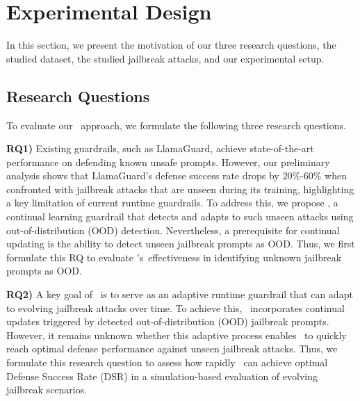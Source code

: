 \section{Experimental Design}
\label{sec:exp_design}
In this section, we present the motivation of our three research questions, the studied dataset, the studied jailbreak attacks, and our experimental setup.

\subsection{Research Questions}
To evaluate our \ourapp~approach, we formulate the following three research questions.

{\bf RQ1)} {\bf \rqone}
Existing guardrails, such as LlamaGuard, achieve state-of-the-art performance on defending known unsafe prompts. However, our preliminary analysis shows that LlamaGuard’s defense success rate drops by 20\%-60\% when confronted with jailbreak attacks that are unseen during its training, highlighting a key limitation of current runtime guardrails. To address this, we propose \ourapp, a continual learning guardrail that detects and adapts to such unseen attacks using out-of-distribution (OOD) detection. Nevertheless, a prerequisite for continual updating is the ability to detect unseen jailbreak prompts as OOD. Thus, we first formulate this RQ to evaluate \ourapp's~effectiveness in identifying unknown jailbreak prompts as OOD.

{\bf RQ2)} {\bf \rqtwo}
A key goal of \ourapp~is to serve as an adaptive runtime guardrail that can adapt to evolving jailbreak attacks over time. To achieve this, \ourapp~incorporates continual updates triggered by detected out-of-distribution (OOD) jailbreak prompts. However, it remains unknown whether this adaptive process enables \ourapp~to quickly reach optimal defense performance against unseen jailbreak attacks. Thus, we formulate this research question to assess how rapidly \ourapp~can achieve optimal Defense Success Rate (DSR) in a simulation-based evaluation of evolving jailbreak scenarios.

